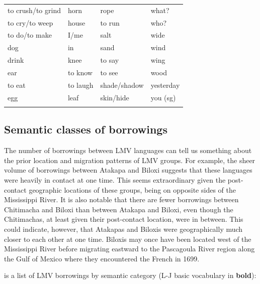 \documentclass[output=paper]{LSP/langsci}
\begin{document}
\begin{table}
\begin{tabular}{llll}
 to crush/to grind       &     horn                   &         rope          &      what?\\
 to cry/to weep          &      house                 &         to run        &      who? \\
 to do/to make           &      I/me                  &         salt          &      wide \\
 dog                     &      in                    &         sand          &      wind \\
 drink                   &      knee                  &         to say        &      wing \\
 ear                     &      to know               &         to see        &      wood \\
 to eat                  &      to laugh              &         shade/shadow  &      yesterday\\
  egg                    &     leaf                   &          skin/hide    &     you (sg) \\
       \lspbottomrule
\end{tabular}                                                                 
\end{table}

\subsection{Semantic classes of borrowings}
	
	The number of borrowings between LMV languages can tell us something about the prior location and migration patterns of LMV groups. For example, the sheer volume of borrowings between Atakapa and Biloxi suggests that these languages were heavily in contact at one time. This seems extraordinary given the post-contact geographic locations of these groups, being on opposite sides of the Mississippi River. It is also notable that there are fewer borrowings between Chitimacha and Biloxi than between Atakapa and Biloxi, even though the Chitimachas, at least given their post-contact location, were in between. This could indicate, however, that Atakapas and Biloxis were geographically much closer to each other at one time. Biloxis may once have been located west of the Mississippi River before migrating eastward to the Pascagoula River region along the Gulf of Mexico where they encountered the French in 1699.

	 is a list of LMV borrowings by semantic category (L-J basic vocabulary in \textbf{bold}): 
\end{document}
